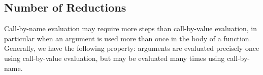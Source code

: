 \subsection{Number of Reductions}\label{subsec:Number_of_Reductions}
Call-by-name evaluation may require more steps than call-by-value evaluation, in particular when an argument is used more than once in the body of a function.
Generally, we have the following property: arguments are evaluated precisely once using call-by-value evaluation, but may be evaluated many times using call-by-name.


